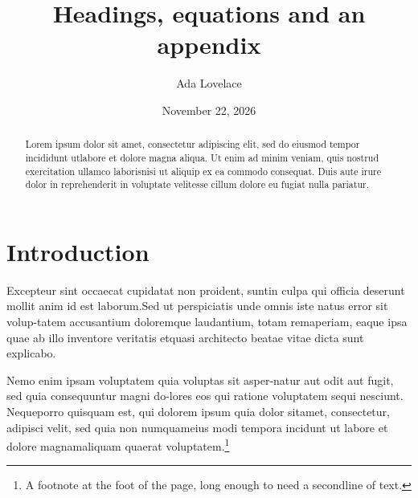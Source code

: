 \documentclass[reprint,aps,pra,superscriptaddress,10pt,nofootinbib,nobalancelastpage]{revtex4-2}
\begin{document}
\title{Headings, equations and an appendix}
\author{Ada Lovelace}
\date{November 22, 2026}
\begin{abstract}
Lorem ipsum dolor sit amet, consectetur adipiscing elit, sed do eiusmod tempor incididunt ut\linebreak labore et dolore magna aliqua. Ut enim ad minim veniam, quis nostrud exercitation ullamco laboris\linebreak nisi ut aliquip ex ea commodo consequat. Duis aute irure dolor in reprehenderit in voluptate velit\linebreak esse cillum dolore eu fugiat nulla pariatur.
\end{abstract}
\maketitle
\section{Introduction}
Excepteur sint occaecat cupidatat non proident, sunt\linebreak in culpa qui officia deserunt mollit anim id est laborum.\linebreak Sed ut perspiciatis unde omnis iste natus error sit volup-\linebreak tatem accusantium doloremque laudantium, totam rem\linebreak aperiam, eaque ipsa quae ab illo inventore veritatis et\linebreak quasi architecto beatae vitae dicta sunt explicabo.

Nemo enim ipsam voluptatem quia voluptas sit asper-\linebreak natur aut odit aut fugit, sed quia consequuntur magni do-\linebreak lores eos qui ratione voluptatem sequi nesciunt. Neque\linebreak porro quisquam est, qui dolorem ipsum quia dolor sit\linebreak amet, consectetur, adipisci velit, sed quia non numquam\linebreak eius modi tempora incidunt ut labore et dolore magnam\linebreak aliquam quaerat voluptatem.\footnote{A footnote at the foot of the page, long enough to need a second\linebreak line of text.}
\end{document}
